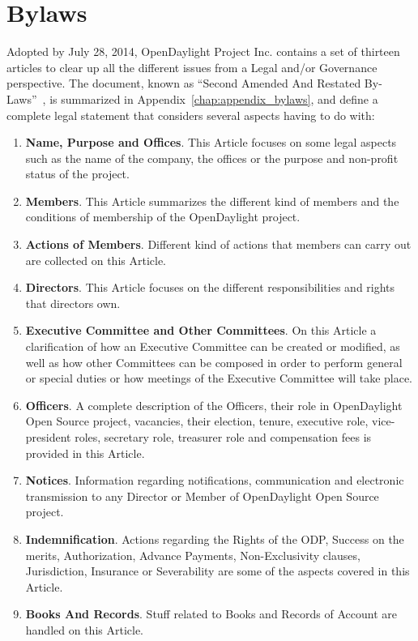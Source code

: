 \documentclass[a4paper, 12pt]{book}
\begin{document}
\section{Bylaws}
\label{sec:bylaws}
Adopted by July 28, 2014, OpenDaylight Project Inc. contains a set of thirteen articles to clear up all the different issues from a Legal and/or Governance perspective. The document, known as ``Second Amended And Restated By-Laws''~\cite{OpenDaylightBylaws}, is summarized in Appendix~\ref{chap:appendix_bylaws}, and define a complete legal statement that considers several aspects having to do with:
\begin{enumerate}\itemsep0pt
 \item{\textbf{Name, Purpose and Offices}}. This Article focuses on some legal aspects such as the name of the company, the offices or the purpose and non-profit status of the project.
 \item{\textbf{Members}}.  This Article summarizes the different kind of members and the conditions of membership of the OpenDaylight project.
 \item{\textbf{Actions of Members}}. Different kind of actions that members can carry out are collected on this Article.
 \item{\textbf{Directors}}. This Article focuses on the different responsibilities and rights that directors own.
 \item{\textbf{Executive Committee and Other Committees}}. On this Article a clarification of how an Executive Committee can be created or modified, as well as how other Committees can be composed in order to perform general or special duties or how meetings of the Executive Committee will take place.
 \item{\textbf{Officers}}. A complete description of the Officers, their role in OpenDaylight Open Source project, vacancies, their election, tenure, executive role, vice-president roles, secretary role, treasurer role and compensation fees is provided in this Article.
 \item{\textbf{Notices}}. Information regarding notifications, communication and electronic transmission to any Director or Member of OpenDaylight Open Source project.
 \item{\textbf{Indemnification}}. Actions regarding the Rights of the ODP, Success on the merits, Authorization, Advance Payments, Non-Exclusivity clauses, Jurisdiction, Insurance or Severability are some of the aspects covered in this Article.
 \item{\textbf{Books And Records}}. Stuff related to Books and Records of Account are handled on this Article.

\end{enumerate}
\end{document}
